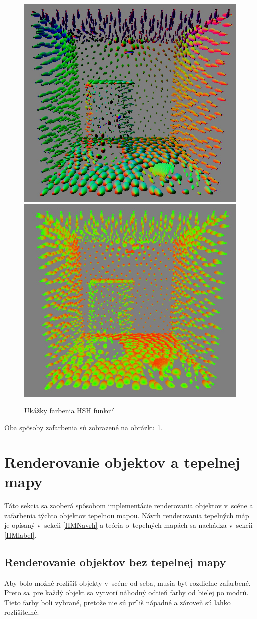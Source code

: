 \begin{figure}[t!]\label{HSHshading}
    \centering
    \includegraphics[width=0.45\linewidth]{obrazky-figures/normalshading.jpg}
    \includegraphics[width=0.46\linewidth]{obrazky-figures/HSHshading.jpg}
    \caption{Ukážky farbenia HSH funkcií}
\end{figure}

\noindent Oba spôsoby zafarbenia sú zobrazené na obrázku \ref{HSHshading}.

\section{Renderovanie objektov a tepelnej mapy}
Táto sekcia sa zaoberá spôsobom implementácie renderovania objektov v~scéne a zafarbenia týchto objektov tepelnou mapou. Návrh renderovania tepelných máp je opísaný v~sekcii \ref{HMNavrh} a teória o~tepelných mapách sa nachádza v~sekcii \ref{HMlabel}.

\subsection*{Renderovanie objektov bez tepelnej mapy}
\label{SceneImpl}
Aby bolo možné rozlíšiť objekty v~scéne od seba, musia byť rozdielne zafarbené. Preto sa~pre každý objekt sa vytvorí náhodný odtieň farby od bielej po modrú. Tieto farby boli vybrané, pretože nie sú príliš nápadné a zároveň sú lahko rozlíšiteľné.

